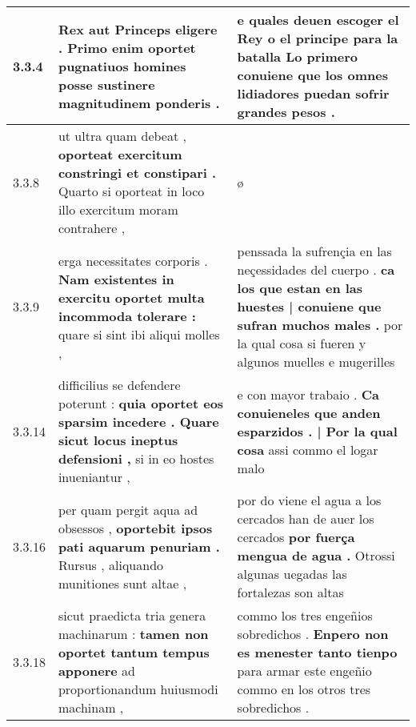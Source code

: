 \begin{tabular}{|p{1cm}|p{6.5cm}|p{6.5cm}|}
3.3.4 & Rex aut Princeps eligere . \textbf{ Primo enim oportet pugnatiuos homines posse } sustinere magnitudinem ponderis . & e quales deuen escoger el Rey o el principe para la batalla \textbf{ Lo primero conuiene } que los omnes lidiadores puedan sofrir grandes pesos . \\\hline
3.3.8 & ut ultra quam debeat , \textbf{ oporteat exercitum constringi et constipari . } Quarto si oporteat in loco illo exercitum moram contrahere , & ø \\\hline
3.3.9 & erga necessitates corporis . \textbf{ Nam existentes in exercitu oportet multa incommoda tolerare : } quare si sint ibi aliqui molles , & penssada la sufrençia en las neçessidades del cuerpo . \textbf{ ca los que estan en las huestes | conuiene que sufran muchos males . } por la qual cosa si fueren y algunos muelles e mugerilles \\\hline
3.3.14 & difficilius se defendere poterunt : \textbf{ quia oportet eos sparsim incedere . Quare sicut locus ineptus defensioni , } si in eo hostes inueniantur , & e con mayor trabaio . \textbf{ Ca conuieneles que anden esparzidos . | Por la qual cosa } assi commo el logar malo \\\hline
3.3.16 & per quam pergit aqua ad obsessos , \textbf{ oportebit ipsos pati aquarum penuriam . } Rursus , aliquando munitiones sunt altae , & por do viene el agua a los cercados han de auer los cercados \textbf{ por fuerça mengua de agua . } Otrossi algunas uegadas las fortalezas son altas \\\hline
3.3.18 & sicut praedicta tria genera machinarum : \textbf{ tamen non oportet tantum tempus apponere } ad proportionandum huiusmodi machinam , & commo los tres engeñios sobredichos . \textbf{ Enpero non es menester tanto tienpo } para armar este engeñio commo en los otros tres sobredichos . \\\hline

\end{tabular}
